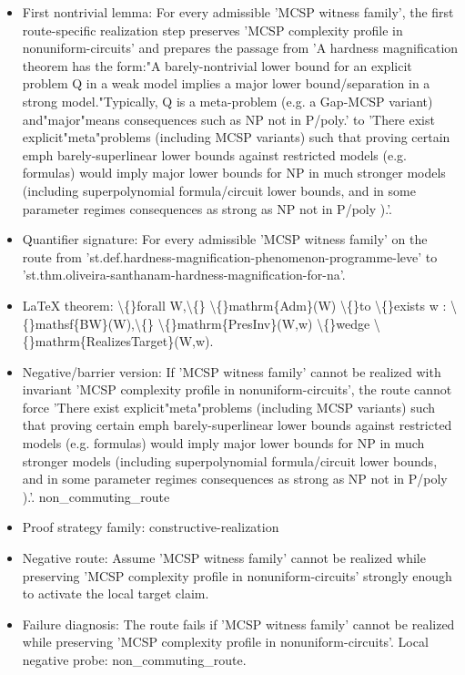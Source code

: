 \documentclass[11pt]{article}
\begin{document}
\begin{itemize}
\item First nontrivial lemma: For every admissible 'MCSP witness family', the first route-specific realization step preserves 'MCSP complexity profile in nonuniform-circuits' and prepares the passage from 'A hardness magnification theorem has the form:"A barely-nontrivial lower bound for an explicit problem Q in a weak model implies a major lower bound/separation in a strong model."Typically, Q is a meta-problem (e.g. a Gap-MCSP variant) and"major"means consequences such as NP not in P/poly.' to 'There exist explicit"meta"problems (including MCSP variants) such that proving certain emph barely-superlinear lower bounds against restricted models (e.g. formulas) would imply major lower bounds for NP in much stronger models (including superpolynomial formula/circuit lower bounds, and in some parameter regimes consequences as strong as NP not in P/poly ).'.
\item Quantifier signature: For every admissible 'MCSP witness family' on the route from 'st.def.hardness-magnification-phenomenon-programme-leve' to 'st.thm.oliveira-santhanam-hardness-magnification-for-na'.
\item LaTeX theorem: \textbackslash\{\}forall W,\textbackslash\{\} \textbackslash\{\}mathrm\{Adm\}(W) \textbackslash\{\}to \textbackslash\{\}exists w : \textbackslash\{\}mathsf\{BW\}(W),\textbackslash\{\} \textbackslash\{\}mathrm\{PresInv\}(W,w) \textbackslash\{\}wedge \textbackslash\{\}mathrm\{RealizesTarget\}(W,w).
\item Negative/barrier version: If 'MCSP witness family' cannot be realized with invariant 'MCSP complexity profile in nonuniform-circuits', the route cannot force 'There exist explicit"meta"problems (including MCSP variants) such that proving certain emph barely-superlinear lower bounds against restricted models (e.g. formulas) would imply major lower bounds for NP in much stronger models (including superpolynomial formula/circuit lower bounds, and in some parameter regimes consequences as strong as NP not in P/poly ).'. non\_commuting\_route
\item Proof strategy family: constructive-realization
\item Negative route: Assume 'MCSP witness family' cannot be realized while preserving 'MCSP complexity profile in nonuniform-circuits' strongly enough to activate the local target claim.
\item Failure diagnosis: The route fails if 'MCSP witness family' cannot be realized while preserving 'MCSP complexity profile in nonuniform-circuits'. Local negative probe: non\_commuting\_route.

\end{itemize}
\end{document}
